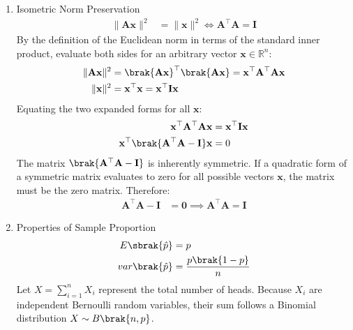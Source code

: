 \begin{enumerate}[label=\thesubsection.\arabic*, ref=\thesubsection.\theenumi]
	\item Isometric Norm Preservation
	\begin{align}
		\|\mathbf{Ax}\|^2 &= \|\mathbf{x}\|^2 \iff \mathbf{A}^\top\mathbf{A} = \mathbf{I} \label{eq:DA2025-isometric_norm}
	\end{align}
	\solution
	By the definition of the Euclidean norm in terms of the standard inner product, evaluate both sides for an arbitrary vector $\mathbf{x} \in \mathbb{R}^n$:
	\begin{align}
		\|\mathbf{Ax}\|^2 &= \brak{\mathbf{Ax}}^\top \brak{\mathbf{Ax}} = \mathbf{x}^\top \mathbf{A}^\top \mathbf{A} \mathbf{x}
		\\
		\|\mathbf{x}\|^2 &= \mathbf{x}^\top \mathbf{x} = \mathbf{x}^\top \mathbf{I} \mathbf{x}
	\end{align}
	Equating the two expanded forms for all $\mathbf{x}$:
	\begin{align}
		\mathbf{x}^\top \mathbf{A}^\top \mathbf{A} \mathbf{x} &= \mathbf{x}^\top \mathbf{I} \mathbf{x}
		\\
		\mathbf{x}^\top \brak{\mathbf{A}^\top \mathbf{A} - \mathbf{I}} \mathbf{x} &= 0
	\end{align}
	The matrix $\brak{\mathbf{A}^\top \mathbf{A} - \mathbf{I}}$ is inherently symmetric. If a quadratic form of a symmetric matrix evaluates to zero for all possible vectors $\mathbf{x}$, the matrix must be the zero matrix. Therefore:
	\begin{align}
		\mathbf{A}^\top \mathbf{A} - \mathbf{I} &= \mathbf{0} \implies \mathbf{A}^\top \mathbf{A} = \mathbf{I}
	\end{align}
	\item Properties of Sample Proportion
	\begin{align}
		E\sbrak{\hat{p}} &= p \label{eq:DA2025-sample_prop_mean}
		\\
		var\brak{\hat{p}} &= \frac{p\brak{1-p}}{n} \label{eq:DA2025-sample_prop_var}
	\end{align}
	\solution
	Let $X = \sum_{i=1}^n X_i$ represent the total number of heads. Because $X_i$ are independent Bernoulli random variables, their sum follows a Binomial distribution $X \sim B\brak{n, p}$.
	

\end{enumerate}
